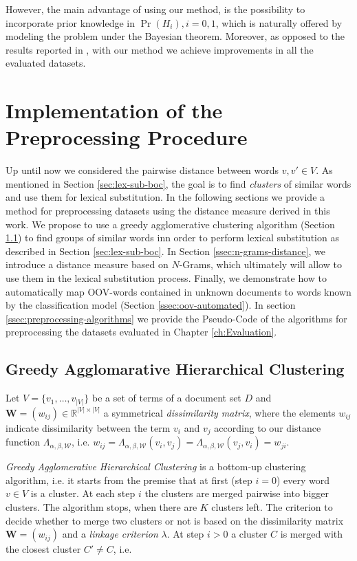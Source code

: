However, the main advantage of using our method, is the possibility to
incorporate prior knowledge in $\Pr(H_i), i=0,1$, which is naturally offered 
by modeling the problem under the Bayesian theorem. Moreover, as opposed to 
the results reported in \cite{baker1998distributional}, with our method we 
achieve improvements in all the evaluated datasets.

\section{Implementation of the Preprocessing Procedure}

Up until now we considered the pairwise distance between words $v, v' \in V$. As
mentioned in Section \ref{sec:lex-sub-boc}, the goal is to find \emph{clusters}
of similar words and use them for lexical substitution. In the following
sections we provide a method for preprocessing datasets using the 
distance measure derived in this work. We propose to use a greedy
agglomerative clustering algorithm (Section \ref{ssec:clustering}) to find groups of
similar words inn order to perform lexical substitution as described
in Section \ref{sec:lex-sub-boc}. In Section \ref{ssec:n-grams-distance}, we 
introduce a distance measure based on $N$-Grams, which ultimately will allow to use 
them in the lexical substitution process. 
Finally, we demonstrate how to automatically map OOV-words contained in unknown documents to words known by
the classification model (Section \ref{ssec:oov-automated}). 
In section \ref{ssec:preprocessing-algorithms} we provide the Pseudo-Code of the algorithms
for preprocessing the datasets evaluated in Chapter \ref{ch:Evaluation}. 


\subsection{Greedy Agglomarative Hierarchical Clustering}
\label{ssec:clustering}

Let $V = \{v_1,\ldots,v_{|V|}\}$ be a set of terms of a document set $D$ and
$\mathbf{W}=(w_{ij}) \in \mathbb{R}^{|V|\times|V|}$ a symmetrical \emph{dissimilarity matrix}, 
where the elements $w_{ij}$ indicate dissimilarity between the term $v_i$ and
$v_j$ according to our distance function $\Lambda_{\alpha, \beta, \mathcal{W}}$,
i.e.
$w_{ij} = \Lambda_{\alpha, \beta, \mathcal{W}}(v_i, v_j) = \Lambda_{\alpha,
\beta, \mathcal{W}}(v_j, v_i) = w_{ji}$.

\emph{Greedy Agglomerative Hierarchical Clustering} is a bottom-up
clustering algorithm, i.e. it starts from the premise that at first (step
$i=0$) every word $v \in V$ is a cluster. At each step $i$ the clusters are merged pairwise into bigger
clusters. The algorithm stops, when there are $K$ clusters left. The criterion
to decide whether to merge two clusters or not is based on the dissimilarity
matrix $\mathbf{W} = (w_{ij})$ and a \emph{linkage criterion} $\lambda$. At
step $i>0$ a cluster $C$ is merged with the closest cluster $C' \neq C$, i.e.

